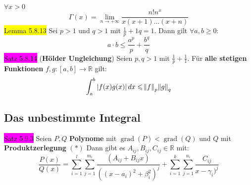 \documentclass[landscape, 10pt]{article}
\newcommand{\R}{\mathbb{R}}
\begin{document}
\begin{multicols}{3}
                            \textcolor{NavyBlue}{
                            $\forall x>0$}
                            \begin{equation*}
                                   \Gamma(x)
                                   =\lim\limits_{n\to+\infty}
                                   \frac{n!n^x}{x(x+1)...(x+n)}
                            \end{equation*}
              \colorbox{yellow}{Lemma 5.8.13}
                     Sei \textcolor{NavyBlue}{$p>1$} und 
                     \textcolor{NavyBlue}{$q>1$} mit 
                     \textcolor{NavyBlue}{
                     $\frac{1}{p}+{1}{q}=1$}. Dann gilt 
                     \textcolor{NavyBlue}{
                     $\forall a,b\geqslant0$}:
                     \begin{equation*}
                            a\cdot b\leqslant
                            \frac{a^p}{p}+\frac{b^q}{q}
                     \end{equation*}
              \colorbox{magenta}{Satz 5.8.14} 
              (\textbf{Hölder Ungleichung}) 
                     Seien \textcolor{NavyBlue}{$p,q>1$} mit 
                     \textcolor{NavyBlue}{
                     $\frac{1}{p}+\frac{1}{1}$}. Für 
                     \textbf{alle stetigen Funktionen} 
                     \textcolor{NavyBlue}{
                     $f,g:[a,b]\longrightarrow\R$} gilt:
                     \begin{equation*}
                            \int_a^b|f(x)g(x)|\,dx
                            \leqslant\norm{f}_p\norm{g}_q
                     \end{equation*}
       \subsection{Das unbestimmte Integral}
              \colorbox{magenta}{Satz 5.9.3} 
                     Seien \textcolor{NavyBlue}{$P,Q$} 
                     \textbf{Polynome} mit 
                     \textcolor{NavyBlue}{
                     $\operatorname{grad}(P)
                     <\operatorname{grad}(Q)$} und 
                     \textcolor{NavyBlue}{$Q$}
                     mit \textbf{Produktzerlegung} $(*)$ 
                     Dann gibt es 
                     \textcolor{NavyBlue}{
                     $A_{ij},B_{ij},C_{ij}\in\R$} mit:
                     \begin{equation*}
                            \frac{P(x)}{Q(x)}
                            =\sum_{i=1}^l\sum_{j=1}^{m_i}
                            \frac{(A_{ij}+B_{ij}x)}{((x-a_i)^2
                            +\beta_i^2)^j}
                            +\sum_{i=1}^k\sum_{j=1}^{n_i}
                            \frac{C_{ij}}{x-\gamma_i)^j}
                     \end{equation*}



\end{multicols}
\end{document}
